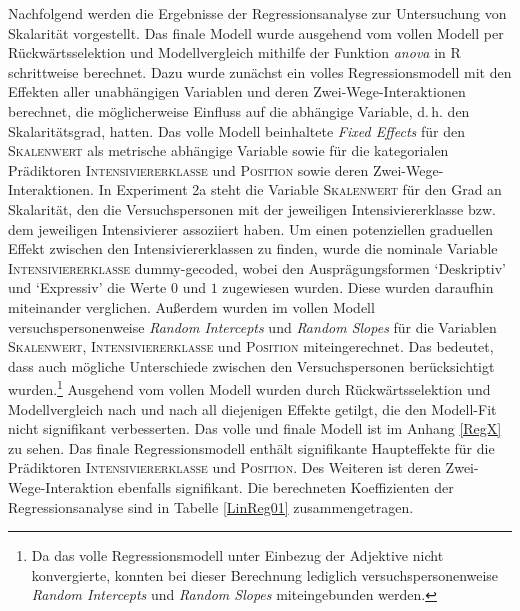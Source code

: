 \noindent Nachfolgend werden die Ergebnisse der Regressionsanalyse zur Untersuchung von Skalarität vorgestellt. Das finale Modell wurde ausgehend vom vollen Modell per Rückwärtsselektion und Modellvergleich mithilfe der Funktion \textit{anova} in R schrittweise berechnet. Dazu wurde zunächst ein volles Regressionsmodell mit den Effekten aller unabhängigen Variablen und deren Zwei-Wege-Interaktionen berechnet, die möglicherweise Einfluss auf die abhängige Variable, d.\,h. den Skalaritätsgrad, hatten. Das volle Modell beinhaltete \textit{Fixed Effects} für den \textsc{Skalenwert} als metrische abhängige Variable sowie für die kategorialen Prädiktoren \textsc{Intensiviererklasse} und \textsc{Position} sowie deren Zwei-Wege-Interaktionen. In Experiment 2a steht die Variable \textsc{Skalenwert} für den Grad an Skalarität, den die Versuchspersonen mit der jeweiligen Intensiviererklasse bzw. dem jeweiligen Intensivierer assoziiert haben. Um einen potenziellen graduellen Effekt zwischen den Intensiviererklassen zu finden, wurde die nominale Variable \textsc{Intensiviererklasse} dummy-gecoded, wobei den Ausprägungsformen `Deskriptiv' und `Expressiv' die Werte $0$ und $1$ zugewiesen wurden. Diese wurden daraufhin miteinander verglichen. Außerdem wurden im vollen Modell versuchspersonenweise \textit{Random Intercepts} und \textit{Random Slopes} für die Variablen \textsc{Skalenwert}, \textsc{Intensiviererklasse} und \textsc{Position} miteingerechnet. Das bedeutet, dass auch mögliche Unterschiede zwischen den Versuchspersonen berücksichtigt wurden.\footnote{Da das volle Regressionsmodell unter Einbezug der Adjektive nicht konvergierte, konnten bei dieser Berechnung lediglich versuchspersonenweise \textit{Random Intercepts} und \textit{Random Slopes} miteingebunden werden.} Ausgehend vom vollen Modell wurden durch Rückwärtsselektion und Modellvergleich nach und nach all diejenigen Effekte getilgt, die den Modell-Fit nicht signifikant verbesserten. Das volle und finale Modell ist im Anhang \ref{RegX} zu sehen. Das finale Regressionsmodell enthält signifikante Haupteffekte für die Prädiktoren \textsc{Intensiviererklasse} und \textsc{Position}. Des Weiteren ist deren Zwei-Wege-Interaktion ebenfalls signifikant. Die berechneten Koeffizienten der Regressionsanalyse sind in {Tabelle \ref{LinReg01}} zusammengetragen.

